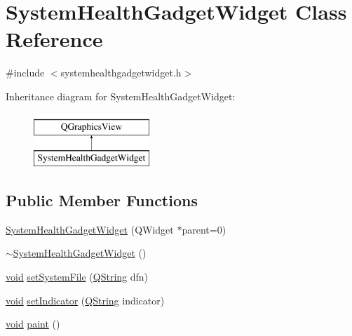 \hypertarget{class_system_health_gadget_widget}{\section{System\-Health\-Gadget\-Widget Class Reference}
\label{class_system_health_gadget_widget}
}


{\ttfamily \#include $<$systemhealthgadgetwidget.\-h$>$}

Inheritance diagram for System\-Health\-Gadget\-Widget\-:\begin{figure}[H]
\begin{center}
\leavevmode
\includegraphics[height=2.000000cm]{class_system_health_gadget_widget}
\end{center}
\end{figure}
\subsection*{Public Member Functions}
\begin{DoxyCompactItemize}
\item 
\hyperlink{group___system_health_plugin_ga8c9b20860af6995ec8b6970079e00477}{System\-Health\-Gadget\-Widget} (Q\-Widget $\ast$parent=0)
\item 
\hyperlink{group___system_health_plugin_gaafd1c69ed4569708eef2b628c1125ea8}{$\sim$\-System\-Health\-Gadget\-Widget} ()
\item 
\hyperlink{group___u_a_v_objects_plugin_ga444cf2ff3f0ecbe028adce838d373f5c}{void} \hyperlink{group___system_health_plugin_ga1caae283affc79dc1e9e0303d39d4158}{set\-System\-File} (\hyperlink{group___u_a_v_objects_plugin_gab9d252f49c333c94a72f97ce3105a32d}{Q\-String} dfn)
\item 
\hyperlink{group___u_a_v_objects_plugin_ga444cf2ff3f0ecbe028adce838d373f5c}{void} \hyperlink{group___system_health_plugin_gaf6ee345730445a2552355fcd54cb33cf}{set\-Indicator} (\hyperlink{group___u_a_v_objects_plugin_gab9d252f49c333c94a72f97ce3105a32d}{Q\-String} indicator)
\item 
\hyperlink{group___u_a_v_objects_plugin_ga444cf2ff3f0ecbe028adce838d373f5c}{void} \hyperlink{group___system_health_plugin_ga58a24548867f2bb40b36dfc3e0fc4b9e}{paint} ()
\end{DoxyCompactItemize}

